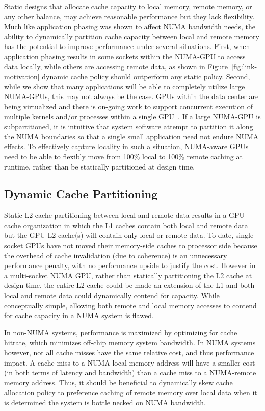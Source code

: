 Static designs that allocate cache capacity to local memory, remote memory, or any other balance,
 may achieve reasonable performance but they lack flexibility. Much
like application phasing was shown to affect NUMA bandwidth needs, the ability to
dynamically partition cache capacity between local and remote memory has the potential
to improve performance under several situations. First, when application phasing
results in some sockets within the NUMA-GPU to access data locally, while others
are accessing remote data, as shown in Figure~\ref{fig:link-motivation} dynamic
cache policy should outperform any static policy. Second, while we show that many
applications will be able to completely utilize large NUMA-GPUs, this may not always
be the case.  GPUs within the data center are being virtualized and there is on-going
work to support concurrent execution of multiple kernels and/or processes within a
single GPU~\cite{XXX}. If a large NUMA-GPU is subpartitioned, it is intuitive that system
software attempt to partition it along the NUMA boundaries so that a single small
application need not endure NUMA effects.  To effectively capture locality in such
a situation, NUMA-aware GPUs need to be able to flexibly move from 100\% local to
100\% remote caching at runtime, rather than be statically partitioned at design time.

\subsection{Dynamic Cache Partitioning}

Static L2 cache partitioning between local and remote data results in a GPU cache
organization in which the L1 caches contain both local and remote data but the GPU
L2 cache(s) will contain only local or remote data.  To-date, single socket GPUs
have not moved their memory-side caches to processor side because the overhead of
cache invalidation (due to coherence) is an unnecessary performance penalty, with
no performance upside to justify the cost.  However in a multi-socket NUMA GPU,
rather than statically partitioning the L2 cache at design time, the entire L2 cache
could be made an extension of the L1 and both local and remote data could dynamically
contend for capacity.  While conceptually simple, allowing both remote and local
memory accesses to contend for cache capacity in a NUMA system is flawed.

In non-NUMA systems, performance is maximized by optimizing for cache hitrate, which
minimizes off-chip memory system bandwidth.  In NUMA systems however, not all cache
misses have the same relative cost, and thus performance impact.  A cache miss to a 
NUMA-local memory address will have a smaller cost (in both terms of latency and bandwidth)
than a cache miss to a NUMA-remote memory address.  Thus, it should be beneficial
to dynamically skew cache allocation policy to preference caching of remote memory over local
data when it is determined the system is bottle necked on NUMA bandwidth.

